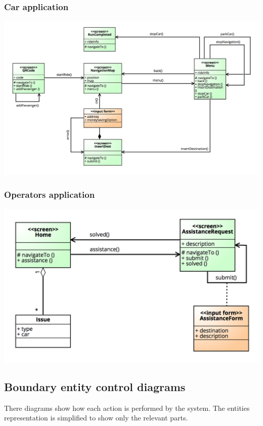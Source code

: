 \documentclass[]{article}
\begin{document}
\subsubsection{Car application}\label{car-application}

\centerline{\includegraphics{./images/UX_Car.png}}

\subsubsection{Operators application}\label{operators-application}

\centerline{\includegraphics{./images/UX_Operator.png}}

\subsection{Boundary entity control
diagrams}\label{boundary-entity-control-diagrams}

There diagrams show how each action is performed by the system. The
entities representation is simplified to show only the relevant parts.
\end{document}

